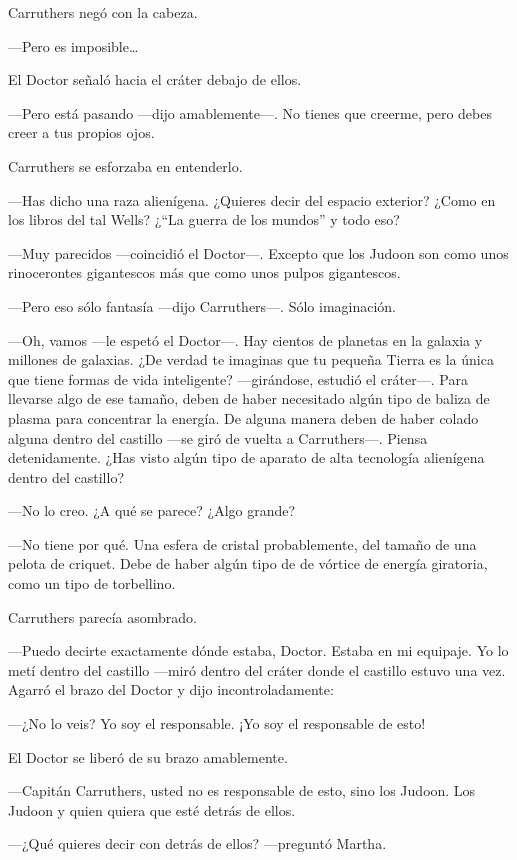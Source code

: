 Carruthers negó con la cabeza.

---Pero es imposible\ldots{}

El Doctor señaló hacia el cráter debajo de ellos.

---Pero está pasando ---dijo amablemente---. No tienes que creerme, pero
debes creer a tus propios ojos.

Carruthers se esforzaba en entenderlo.

---Has dicho una raza alienígena. ¿Quieres decir del espacio exterior?
¿Como en los libros del tal Wells? ¿``La guerra de los mundos'' y todo
eso?

---Muy parecidos ---coincidió el Doctor---. Excepto que los Judoon son
como unos rinocerontes gigantescos más que como unos pulpos gigantescos.

---Pero eso sólo fantasía ---dijo Carruthers---. Sólo imaginación.

---Oh, vamos ---le espetó el Doctor---. Hay cientos de planetas en la
galaxia y millones de galaxias. ¿De verdad te imaginas que tu pequeña
Tierra es la única que tiene formas de vida inteligente? ---girándose,
estudió el cráter---. Para llevarse algo de ese tamaño, deben de haber
necesitado algún tipo de baliza de plasma para concentrar la energía. De
alguna manera deben de haber colado alguna dentro del castillo ---se
giró de vuelta a Carruthers---. Piensa detenidamente. ¿Has visto algún
tipo de aparato de alta tecnología alienígena dentro del castillo?

---No lo creo. ¿A qué se parece? ¿Algo grande?

---No tiene por qué. Una esfera de cristal probablemente, del tamaño de
una pelota de criquet. Debe de haber algún tipo de de vórtice de energía
giratoria, como un tipo de torbellino.

Carruthers parecía asombrado.

---Puedo decirte exactamente dónde estaba, Doctor. Estaba en mi
equipaje. Yo lo metí dentro del castillo ---miró dentro del cráter donde
el castillo estuvo una vez. Agarró el brazo del Doctor y dijo
incontroladamente:

---¿No lo veis? Yo soy el responsable. ¡Yo soy el responsable de esto!

El Doctor se liberó de su brazo amablemente.

---Capitán Carruthers, usted no es responsable de esto, sino los Judoon.
Los Judoon y quien quiera que esté detrás de ellos.

---¿Qué quieres decir con detrás de ellos? ---preguntó Martha.

